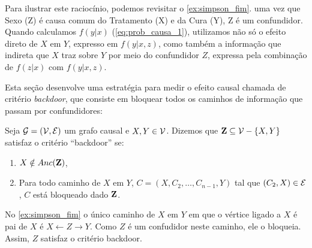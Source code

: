 Para ilustrar este raciocínio, 
podemos revisitar o \cref{ex:simpson_fim}.
uma vez que Sexo (Z) é causa comum do Tratamento (X) e
da Cura (Y), Z é um confundidor.
Quando calculamos $f(y|x)$ (\cref{eq:prob_causa_1}), 
utilizamos não só o efeito direto de $X$ em $Y$, 
expresso em $f(y|x,z)$, como também 
a informação que indireta que $X$ traz sobre $Y$
por meio do confundidor $Z$,
expressa pela combinação de $f(z|x)$ com $f(y|x,z)$.

Esta seção desenvolve uma estratégia para
medir o efeito causal chamada de 
critério \textit{backdoor}, que
consiste em bloquear 
todos os caminhos de informação que passam por confundidores:

\begin{definition}
 \label{def:backdoor}
 Seja ${\mathcal G} = ({\mathcal V}, {\mathcal E})$ um grafo causal e $X, Y \in {\mathcal V}$.
 Dizemos que ${\mathbf{Z}} \subseteq {\mathcal V} - \{X,Y\}$ satisfaz 
 o critério ``backdoor'' se:
 \begin{enumerate}
  \item $X \notin Anc({\mathbf{Z}})$,
  \item Para todo caminho de $X$ em $Y$, 
  $C = (X, C_2, \ldots, C_{n-1}, Y)$ tal que
  $(C_2, X) \in {\mathcal E}$, $C$ está bloqueado dado ${\mathbf{Z}}$.
 \end{enumerate}
\end{definition}

\begin{example}
 No \cref{ex:simpson_fim} o único caminho de $X$ em $Y$ em que
 o vértice ligado a $X$ é pai de $X$ é $X \leftarrow Z \rightarrow Y$.
 Como $Z$ é um confudidor neste caminho, ele o bloqueia.
 Assim, $Z$ satisfaz o critério backdoor.
\end{example}

